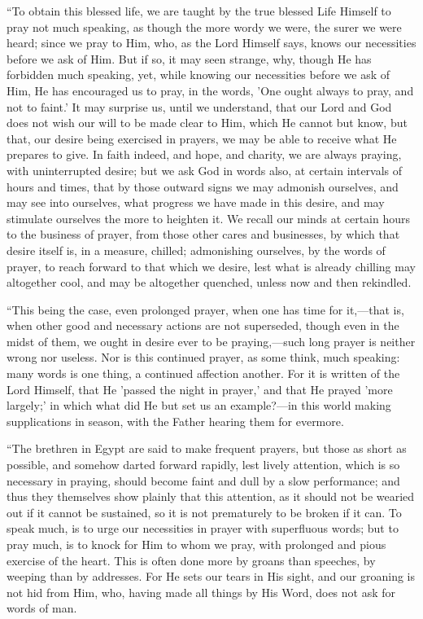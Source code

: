 ``To obtain this blessed life, we are taught by the true
blessed Life Himself to pray not much speaking, as though the more
wordy we were, the surer we were heard; since we pray to Him, who, as
the Lord Himself says, knows our necessities before we ask of Him. But
if so, it may seen strange, why, though He has forbidden much
speaking, yet, while knowing our necessities
before we ask of Him, He has encouraged us to pray, in the words, 'One
ought always to pray, and not to faint.' It may surprise us, until we
understand, that our Lord and God does not wish our will to be made
clear to Him, which He cannot but know, but that, our desire being
exercised in prayers, we may be able to receive what He prepares to
give. In faith indeed, and hope, and charity, we are always praying,
with uninterrupted desire; but we ask God in words also, at certain
intervals of hours and times, that by those outward signs we may
admonish ourselves, and may see into ourselves, what progress we have
made in this desire, and may stimulate ourselves the more to heighten
it. We recall our minds at certain hours to the business of prayer,
from those other cares and businesses, by which that desire itself is,
in a measure, chilled; admonishing ourselves, by the words of prayer,
to reach forward to that which we desire, lest what is already
chilling may altogether cool, and may be altogether quenched, unless
now and then rekindled.

``This being the case, even prolonged prayer, when one has time
for it,—that is, when other good and necessary actions are not
superseded, though even in the midst of them, we ought in desire ever
to be praying,—such long prayer is neither wrong nor useless. Nor is
this continued prayer, as some think, much speaking: many words is one
thing, a continued affection another. For it is written of the Lord
Himself, that He 'passed the night in prayer,' and that He prayed
'more largely;' in which what did He but set us an example?—in this
world making supplications in season, with the Father hearing them for
evermore.

``The brethren in Egypt are said to make frequent prayers, but
those as short as possible, and somehow darted forward rapidly, lest
lively attention, which is so necessary in praying, should become
faint and dull by a slow performance; and thus they themselves show
plainly that this attention, as it should not be wearied out if it
cannot be sustained, so it is not prematurely to be broken if it can.
To speak much, is to urge our necessities in prayer with superfluous
words; but to pray much, is to knock for Him to whom we pray, with
prolonged and pious exercise of the heart. This is often done more by
groans than speeches, by weeping than by addresses. For He sets our
tears in His sight, and our groaning is not hid from Him, who, having
made all things by His Word, does not ask for words of man.

